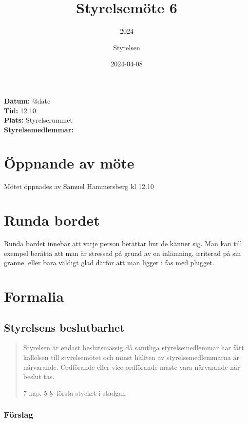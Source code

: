 \documentclass[protokoll]{dvd}
\begin{document}
\title{Styrelsemöte 6}
\subtitle{2024}
\author{Styrelsen}
\date{2024-04-08}


\textbf{Datum:} \csname @date\endcsname\\
\textbf{Tid:} 12.10\\
\textbf{Plats:} Styrelserummet\\
\textbf{Styrelsemedlemmar:}
\begin{närvarande_förtroendevalda}
\end{närvarande_förtroendevalda}

\section{Öppnande av möte}

Mötet öppnades av Samuel Hammersberg kl 12.10

\section{Runda bordet}

Runda bordet innebär att varje person berättar hur de känner sig.
Man kan till exempel berätta att man är stressad på grund av en inlämning, irriterad på sin granne, eller bara väldigt glad därför att man ligger i fas med plugget.

\section{Formalia}

\subsection{Styrelsens beslutbarhet}

\blockquote[7 kap. 5 \S~första stycket i stadgan][]{%
    Styrelsen är endast beslutsmässig då samtliga styrelsemedlemmar har fått kallelsen till styrelsemötet och minst hälften av styrelsemedlemmarna är närvarande.
    Ordförande eller vice ordförande måste vara närvarande när beslut tas.
}

\subsubsection*{Förslag}
\end{document}
